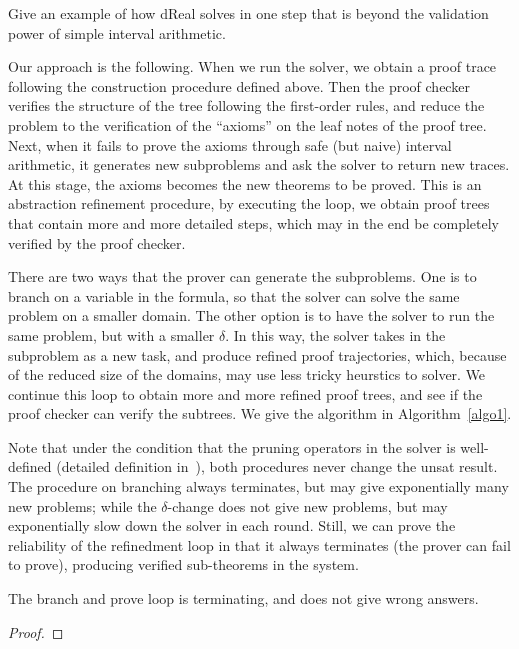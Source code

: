 \documentclass[envcountsect]{llncs}
\begin{document}
\begin{example}
Give an example of how dReal solves in one step that is beyond the validation
power of simple interval arithmetic.
\end{example}

Our approach is the following. When we run the solver, we obtain a proof trace
following the construction procedure defined above. Then the proof checker
verifies the structure of the tree following the first-order rules, and reduce
the problem to the verification of the ``axioms'' on the leaf notes of the
proof tree. Next, when it fails to prove the axioms through safe (but naive)
interval arithmetic, it generates new subproblems and ask the solver to return
new traces. At this stage, the axioms becomes the new theorems to be proved.
This is an abstraction refinement procedure, by executing the loop, we obtain
proof trees that contain more and more detailed steps, which may in the end be
completely verified by the proof checker. 

There are two ways that the prover can generate the subproblems. One is to
branch on a variable in the formula, so that the solver can solve the same
problem on a smaller domain. The other option is to have the solver to run the
same problem, but with a smaller $\delta$. In this way, the solver takes in the
subproblem as a new task, and produce refined proof trajectories, which,
because of the reduced size of the domains, may use less tricky heurstics to
solver. We continue this loop to obtain more and more refined proof trees, and
see if the proof checker can verify the subtrees. We give the algorithm in
Algorithm~\ref{algo1}. 

\begin{example}
 
\end{example}

Note that under the condition that the pruning operators in the solver is
well-defined (detailed definition in~\cite{}), both procedures never change the
unsat result. The procedure on branching always terminates, but may give
exponentially many new problems; while the $\delta$-change does not give new
problems, but may exponentially slow down the solver in each round. Still, we
can prove the reliability of the refinedment loop in that it always terminates
(the prover can fail to prove), producing verified sub-theorems in the system. 
\begin{proposition}
The branch and prove loop is terminating, and does not give wrong answers. 
\end{proposition}
\begin{proof}
\end{proof}
\end{document}
